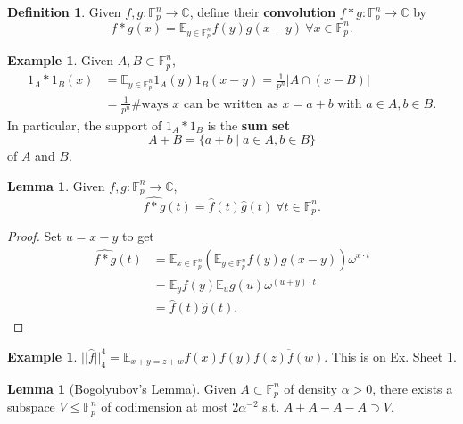 \documentclass{article}
\theoremstyle{definition}
\newtheorem{lemma}[theorem]{Lemma}
\newtheorem{example}[theorem]{Example}
\newtheorem{defn}[theorem]{Definition}
\begin{document}

\begin{defn}
    Given $f, g : \mathbb{F}_p^n \to \mathbb{C}$, define their \textbf{convolution} $f * g :\mathbb{F}_p^n \to \mathbb{C}$ by $$f*g(x) = \mathbb{E}_{y \in \mathbb{F}_p^n}f(y)g(x-y) ~\forall x \in \mathbb{F}_p^n.$$
\end{defn}
\begin{example}
    Given $A, B \subset \mathbb{F}_p^n$, 
    \begin{align*}
        1_A * 1_B(x) &= \mathbb{E}_{y \in \mathbb{F}_p^n}1_A(y)1_B(x-y) = \frac{1}{p^n}|A \cap (x-B)| \\
        &= \frac{1}{p^n} \# \text{ways }x \text{ can be written as }x=a+b \text{ with }a \in A, b \in B.
    \end{align*}
    In particular, the support of $1_A * 1_B$ is the \textbf{sum set} \[
    A+B = \{a+b \mid a \in A, b \in B\}
    \]
    of $A$ and $B$.
\end{example}
\begin{lemma}
    Given $f, g : \mathbb{F}_p^n \to \mathbb{C}$, $$\widehat{f * g}(t) = \hat{f}(t)\hat{g}(t) ~\forall t \in \mathbb{F}_p^n.$$
\end{lemma}
\begin{proof}
    Set $u = x-y$ to get
    \begin{align*}
        \widehat{f * g}(t) &= \mathbb{E}_{x \in \mathbb{F}_p^n}\left(\mathbb{E}_{y \in \mathbb{F}_p^n}f(y)g(x-y)\right)\omega^{x \cdot t} \\
        &= \mathbb{E}_y f(y) \mathbb{E}_u g(u) \omega^{(u+y)\cdot t} \\
        &= \hat{f}(t)\hat{g}(t).
    \end{align*}
\end{proof}
\begin{example}
    $||\hat{f}||_4^4 = \mathbb{E}_{x+y=z+w}f(x)f(y)\overline{f(z)f(w)}$. This is on Ex. Sheet 1.
\end{example}
\begin{lemma}[Bogolyubov's Lemma]
    Given $A \subset \mathbb{F}_p^n$ of density $\alpha>0$, there exists a subspace $V\le \mathbb{F}_p^n$ of codimension at most $2\alpha^{-2}$ s.t. $A+A-A-A \supset V$. 
\end{lemma}
\end{document}
